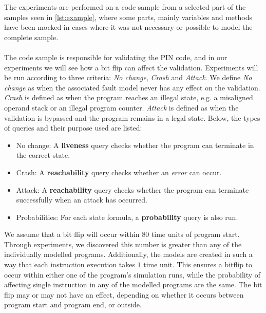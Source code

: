The experiments are performed on a code sample from a selected part of the \jc samples seen in \cref{lst:example}, where some parts, mainly variables and methods have been mocked in cases where it was not necessary or possible to model the complete sample.\\\\
The code sample is responsible for validating the PIN code, and in our experiments we will see how a bit flip can affect the validation. Experiments will be run according to three criteria: \textit{No change}, \textit{Crash} and \textit{Attack}. We define \textit{No change} as when the associated fault model never has any effect on the validation. \textit{Crash} is defined as when the program reaches an illegal state, e.g. a misaligned operand stack or an illegal program counter. \textit{Attack} is defined as when the validation is bypassed and the program remains in a legal state. Below, the types of queries and their purpose used are listed:

\begin{itemize}
\item No change: A \textbf{liveness} query checks whether the program can terminate in the correct state.
\item Crash: A \textbf{reachability} query checks whether an \textit{error} can occur.
\item Attack: A \textbf{reachability} query checks whether the program can terminate successfully when an attack has occurred.
\item Probabilities: For each state formula, a \textbf{probability} query is also run.
\end{itemize}

\noindent We assume that a bit flip will occur within $80$ time units of program start. Through experiments, we discovered this number is greater than any of the individually modelled programs. Additionally, the models are created in such a way that each instruction execution takes $1$ time unit. This ensures a bitflip to occur within either one of the program's simulation runs, while the probability of affecting single instruction in any of the modelled programs are the same. The bit flip may or may not have an effect, depending on whether it occurs between program start and program end, or outside.